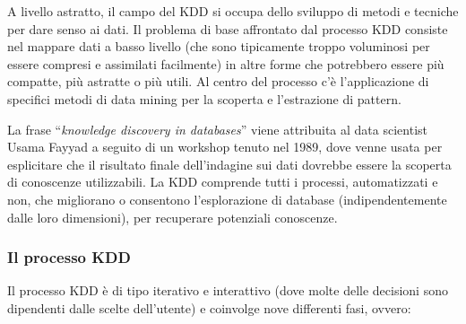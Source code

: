 A livello astratto, il campo del KDD si occupa dello sviluppo di metodi e tecniche per dare senso ai dati. Il problema di base affrontato dal processo KDD consiste nel mappare dati a basso livello (che sono tipicamente troppo voluminosi per essere compresi e assimilati facilmente) in altre forme che potrebbero essere più compatte, più astratte o più utili. Al centro del processo c'è l'applicazione di specifici metodi di data mining per la scoperta e l'estrazione di pattern.\cite{from_data_mining_to_knowledge_discovery}

La frase “\textit{knowledge discovery in databases}” viene attribuita al data scientist Usama Fayyad a seguito di un workshop tenuto nel 1989, dove venne usata per esplicitare che il risultato finale dell'indagine sui dati dovrebbe essere la scoperta di conoscenze utilizzabili. La KDD comprende tutti i processi, automatizzati e non, che migliorano o consentono l'esplorazione di database (indipendentemente dalle loro dimensioni), per recuperare potenziali conoscenze.\cite{knowledge_discovery_in_databases}

\subsubsection{Il processo KDD}

Il processo KDD è di tipo iterativo e interattivo (dove molte delle decisioni sono dipendenti dalle scelte dell'utente) e coinvolge nove differenti fasi, ovvero:\cite{researchgate_data_mining_and_knowledge}

